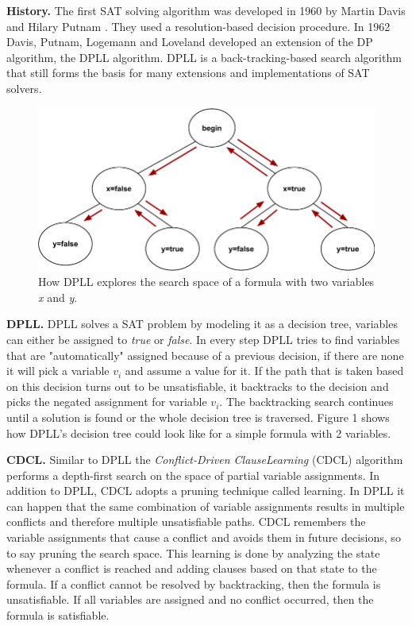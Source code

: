 \documentclass[letterpaper]{article}
\newcommand{\mypar}[1]{{\bf #1.}}
\begin{document}
\mypar{History}
The first SAT solving algorithm was developed in 1960 by Martin Davis and Hilary Putnam \cite{dp}.
They used a resolution-based decision procedure.
In 1962 Davis, Putnam, Logemann and Loveland developed an extension of the DP algorithm, the DPLL algorithm.
DPLL is a back-tracking-based search algorithm that still forms the basis for many extensions and implementations of SAT solvers.
\begin{figure}
	\centering
	\includegraphics[width=\columnwidth]{figures/dpll_branching.pdf}
	\caption{How DPLL explores the search space of a formula with two variables \textit{x} and \textit{y}.
		\label{fig:dpll-branching}}
\end{figure}

\mypar{DPLL}
DPLL solves a SAT problem by modeling it as a decision tree, variables can either be assigned to \textit{true} or \textit{false}.
In every step DPLL tries to find variables that are "automatically" assigned because of a previous decision,
if there are none it will pick a variable $v_i$ and assume a value for it.
If the path that is taken based on this decision turns out to be unsatisfiable, it backtracks to the decision and picks the negated assignment for variable $v_i$.
The backtracking search continues until a solution is found or the whole decision tree is traversed.
Figure 1 shows how DPLL's decision tree could look like for a simple formula with 2 variables.

\mypar{CDCL}
Similar to DPLL the \textit{Conflict-Driven Clause}\linebreak\textit{Learning} (CDCL) algorithm performs a depth-first search on the space of partial variable assignments.
In addition to DPLL, CDCL adopts a pruning technique called learning.
In DPLL it can happen that the same combination of variable assignments results in multiple conflicts and therefore multiple unsatisfiable paths.
CDCL remembers the variable assignments that cause a conflict and avoids them in future decisions, so to say pruning the search space.
This learning is done by analyzing the state whenever a conflict is reached and adding clauses based on that state to the formula.
If a conflict cannot be resolved by backtracking, then the formula is unsatisfiable.
If all variables are assigned and no conflict occurred, then the formula is satisfiable.
\end{document}
